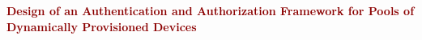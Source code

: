 \documentclass[twoside,11pt,titlepage,a4paper,english,bibliography=totocnumbered,listof=numbered]{scrbook}
\begin{document}
\frontmatter


\begin{titlepage}
	\strut
	\hfill
	\begin{center}
	\vspace{1cm}
		\Huge
		\begin{spacing}{.9}
			\textcolor{DarkRed}{\textbf{Design of an Authentication and Authorization Framework for Pools of Dynamically Provisioned Devices}}\\

\end{spacing}
\end{center}
\end{titlepage}
\end{document}
